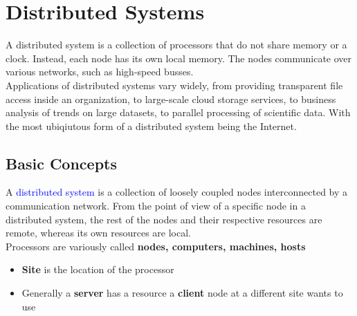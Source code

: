 \documentclass[oneside]{book}
\begin{document}
    \chapter{Distributed Systems}
        A distributed system is a collection of processors that do not share memory or
        a clock. Instead, each node has its own local memory. The nodes communicate over 
        various networks, such as high-speed busses.\\
        Applications of distributed systems vary widely, from providing transparent file access
        inside an organization, to large-scale cloud storage services, to business analysis of 
        trends on large datasets, to parallel processing of scientific data. With the most 
        ubiqiutous form of a distributed system being the Internet.
        \section{Basic Concepts}
            A \textcolor{blue}{distributed system} is a collection of loosely coupled nodes
            interconnected by a communication network. From the point of view of a specific node
            in a distributed system, the rest of the nodes and their respective resources are remote,
            whereas its own resources are local.\\
            Processors are variously called \textbf{nodes, computers, machines, hosts}\\
            \begin{itemize}
                \item \textbf{Site} is the location of the processor
                \item Generally a \textbf{server} has a resource a \textbf{client} node at a different
                site wants to use
            \end{itemize}
\end{document}
